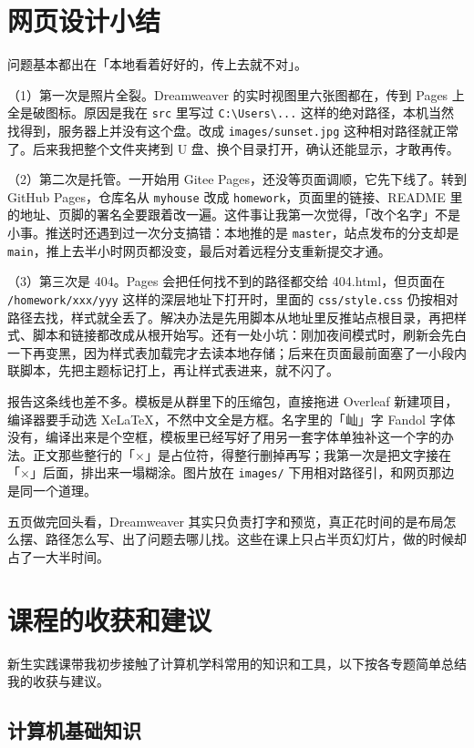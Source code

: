\documentclass[12pt,a4paper,fontset=fandol]{ctexart}
\begin{document}
\section{网页设计小结}

问题基本都出在「本地看着好好的，传上去就不对」。

（1）第一次是照片全裂。Dreamweaver 的实时视图里六张图都在，传到 Pages 上全是破图标。原因是我在 \texttt{src} 里写过 \texttt{C:\textbackslash Users\textbackslash ...} 这样的绝对路径，本机当然找得到，服务器上并没有这个盘。改成 \texttt{images/sunset.jpg} 这种相对路径就正常了。后来我把整个文件夹拷到 U 盘、换个目录打开，确认还能显示，才敢再传。

（2）第二次是托管。一开始用 Gitee Pages，还没等页面调顺，它先下线了。转到 GitHub Pages，仓库名从 \texttt{myhouse} 改成 \texttt{homework}，页面里的链接、README 里的地址、页脚的署名全要跟着改一遍。这件事让我第一次觉得，「改个名字」不是小事。推送时还遇到过一次分支搞错：本地推的是 \texttt{master}，站点发布的分支却是 \texttt{main}，推上去半小时网页都没变，最后对着远程分支重新提交才通。

（3）第三次是 404。Pages 会把任何找不到的路径都交给 404.html，但页面在 \texttt{/homework/xxx/yyy} 这样的深层地址下打开时，里面的 \texttt{css/style.css} 仍按相对路径去找，样式就全丢了。解决办法是先用脚本从地址里反推站点根目录，再把样式、脚本和链接都改成从根开始写。还有一处小坑：刚加夜间模式时，刷新会先白一下再变黑，因为样式表加载完才去读本地存储；后来在页面最前面塞了一小段内联脚本，先把主题标记打上，再让样式表进来，就不闪了。

报告这条线也差不多。模板是从群里下的压缩包，直接拖进 Overleaf 新建项目，编译器要手动选 XeLaTeX，不然中文全是方框。名字里的「屾」字 Fandol 字体没有，编译出来是个空框，模板里已经写好了用另一套字体单独补这一个字的办法。正文那些整行的「×」是占位符，得整行删掉再写；我第一次是把文字接在「×」后面，排出来一塌糊涂。图片放在 \texttt{images/} 下用相对路径引，和网页那边是同一个道理。

五页做完回头看，Dreamweaver 其实只负责打字和预览，真正花时间的是布局怎么摆、路径怎么写、出了问题去哪儿找。这些在课上只占半页幻灯片，做的时候却占了一大半时间。

\section{课程的收获和建议}

新生实践课带我初步接触了计算机学科常用的知识和工具，以下按各专题简单总结我的收获与建议。

\subsection{计算机基础知识}
\end{document}
